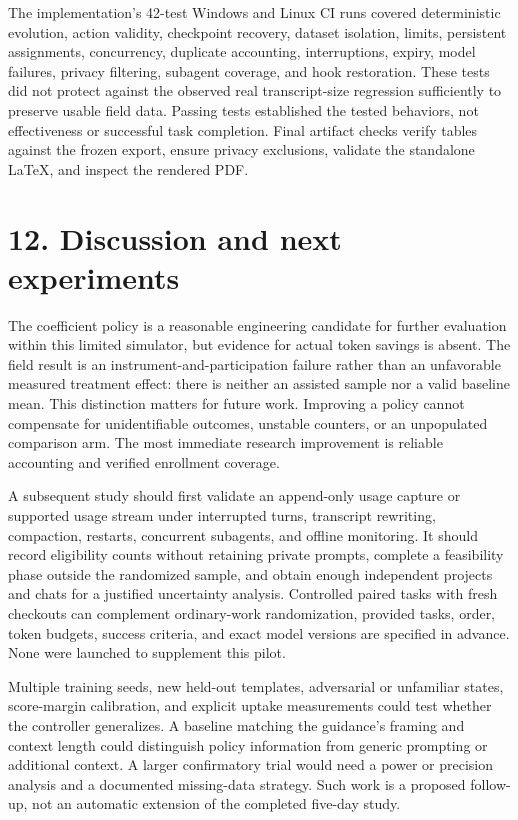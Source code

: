 \documentclass[11pt]{article}
\begin{document}
The implementation's 42-test Windows and Linux CI runs covered deterministic evolution, action validity, checkpoint recovery, dataset isolation, limits, persistent assignments, concurrency, duplicate accounting, interruptions, expiry, model failures, privacy filtering, subagent coverage, and hook restoration. These tests did not protect against the observed real transcript-size regression sufficiently to preserve usable field data. Passing tests established the tested behaviors, not effectiveness or successful task completion. Final artifact checks verify tables against the frozen export, ensure privacy exclusions, validate the standalone LaTeX, and inspect the rendered PDF.

\section*{12. Discussion and next experiments}
The coefficient policy is a reasonable engineering candidate for further evaluation within this limited simulator, but evidence for actual token savings is absent. The field result is an instrument-and-participation failure rather than an unfavorable measured treatment effect: there is neither an assisted sample nor a valid baseline mean. This distinction matters for future work. Improving a policy cannot compensate for unidentifiable outcomes, unstable counters, or an unpopulated comparison arm. The most immediate research improvement is reliable accounting and verified enrollment coverage.

A subsequent study should first validate an append-only usage capture or supported usage stream under interrupted turns, transcript rewriting, compaction, restarts, concurrent subagents, and offline monitoring. It should record eligibility counts without retaining private prompts, complete a feasibility phase outside the randomized sample, and obtain enough independent projects and chats for a justified uncertainty analysis. Controlled paired tasks with fresh checkouts can complement ordinary-work randomization, provided tasks, order, token budgets, success criteria, and exact model versions are specified in advance. None were launched to supplement this pilot.

Multiple training seeds, new held-out templates, adversarial or unfamiliar states, score-margin calibration, and explicit uptake measurements could test whether the controller generalizes. A baseline matching the guidance's framing and context length could distinguish policy information from generic prompting or additional context. A larger confirmatory trial would need a power or precision analysis and a documented missing-data strategy. Such work is a proposed follow-up, not an automatic extension of the completed five-day study.
\end{document}
